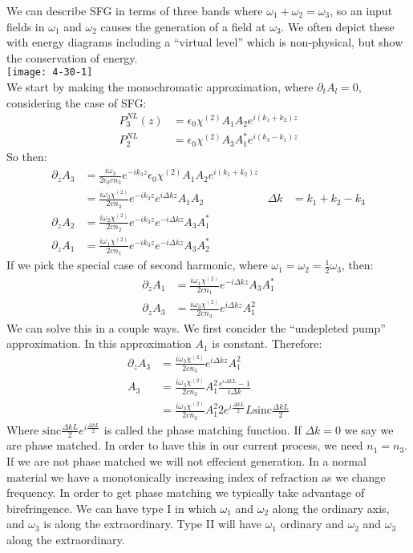 We can describe SFG in terms of three bands where $\omega_1 + \omega_2 = \omega_3$, so an input fields in $\omega_1$ and $\omega_2$ causes the generation of a field at $\omega_3$.
We often depict these with energy diagrams including a ``virtual level'' which is non-physical, but show the conservation of energy.\\
\texttt{[image: 4-30-1]} \\
We start by making the monochromatic approximation, where $\partial_t A_l = 0$, considering the case of SFG:
\begin{align*}
	P_3^{NL}(z) &= \epsilon_0 \chi^{(2)}A_1A_2 e^{i(k_1 + k_2)z} \\
	P_2^{NL} &= \epsilon_0 \chi^{(2)} A_3 A_1^* e^{i(k_3-k_1)z}
\end{align*}
So then:
\begin{align*}
	\partial_z A_3 &= \frac{i\omega_3}{2\epsilon_0 cn_3} e^{-ik_3z} \epsilon_0 \chi^{(2)} A_1A_2 e^{i(k_1 + k_2)z} \\
	&= \frac{i\omega_3\chi^{(2)}}{2cn_3} e^{-ik_3z} e^{i\Delta k z}A_1A_2  & \Delta k &= k_1 + k_2 - k_3 \\
	\partial_z A_2 &= \frac{i\omega_2\chi^{(2)}}{2cn_2} e^{-ik_3z} e^{-i\Delta k z}A_3A_1^* \\
	\partial_z A_1 &= \frac{i\omega_1\chi^{(2)}}{2cn_1} e^{-ik_3z} e^{-i\Delta k z}A_3A_2^*
\end{align*}
If we pick the special case of second harmonic, where $\omega_1=\omega_2=\frac{1}{2}\omega_3$, then:
\begin{align*}
	\partial_z A_1 &= \frac{i\omega_1\chi^{(2)}}{2cn_1} e^{-i\Delta kz} A_3 A_1^* \\
	\partial_z A_3 &= \frac{i\omega_3\chi^{(2)}}{2cn_3} e^{i\Delta kz} A_1^2
\end{align*}
We can solve this in a couple ways. We first concider the ``undepleted pump'' approximation. In this approximation $A_1$ is constant. Therefore:
\begin{align*}
	\partial_z A_3 &= \frac{i\omega_3\chi^{(2)}}{2cn_3} e^{i\Delta kz} A_1^2 \\
	A_3 &= \frac{i\omega_3\chi^{(2)}}{2cn_3} A_1^2 \frac{e^{i\Delta kL} - 1}{i\Delta k} \\
	&= \frac{i\omega_3\chi^{(2)}}{2cn_3} A_1^2 2 e^{i\frac{\Delta k L}{2}} L\text{sinc} \frac{\Delta k L}{2}
\end{align*}
Where $\text{sinc}\frac{\Delta k L}{2} e^{i \frac{\Delta k L}{2}}$ is called the phase matching function.
If $\Delta k=0$ we say we are phase matched. In order to have this in our current process, we need $n_1 = n_3$. If we are not phase matched we will not effecient generation.
In a normal material we have a monotonically increasing index of refraction as we change frequency. In order to get phase matching we typically take advantage of birefringence.
We can have type I in which $\omega_1$ and $\omega_2$ along the ordinary axis, and $\omega_3$ is along the extraordinary. Type II will have $\omega_1$ ordinary and $\omega_2$ and $\omega_3$ along the extraordinary.

